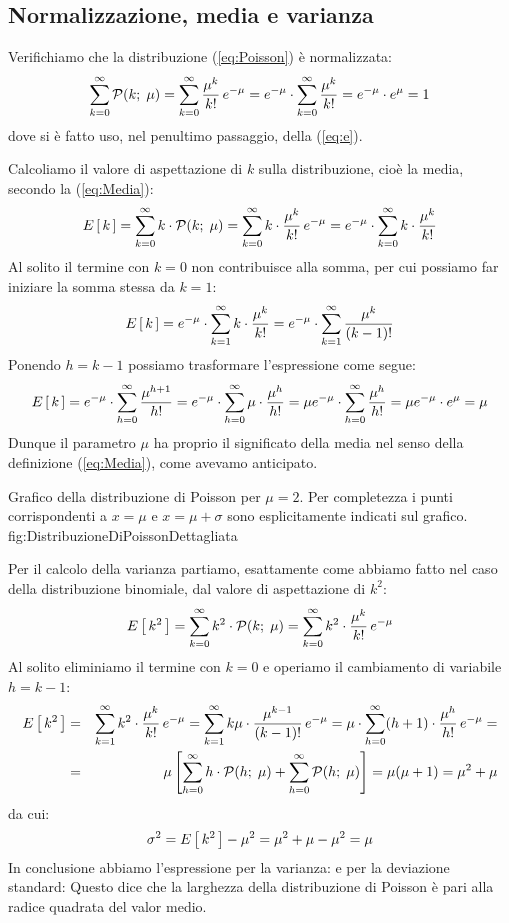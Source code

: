 \subsection{Normalizzazione, media e varianza}

Verifichiamo che la distribuzione (\ref{eq:Poisson}) \`e normalizzata:
$$
\dsum{\poissonpdf{k}{\mu}}{k}{0}{\infty} = 
\dsum{\frac{\mu^k}{k!} \, e^{-\mu}}{k}{0}{\infty} =
e^{-\mu} \cdot \dsum{\frac{\mu^k}{k!}}{k}{0}{\infty} = e^{-\mu} \cdot e^\mu = 1
$$
dove si \`e fatto uso, nel penultimo passaggio, della (\ref{eq:e}).

Calcoliamo il valore di aspettazione di $k$ sulla distribuzione,
cio\`e la media,
secondo la (\ref{eq:Media}):
$$
\expect{k} = \dsum{k \cdot \poissonpdf{k}{\mu}}{k}{0}{\infty}=
\dsum{k \cdot \frac{\mu^k}{k!} \, e^{-\mu}}{k}{0}{\infty} =
e^{-\mu} \cdot \dsum{k \cdot \frac{\mu^k}{k!}}{k}{0}{\infty}
$$
Al solito il termine con $k = 0$ non contribuisce alla somma, per cui
possiamo far iniziare la somma stessa da $k = 1$:
$$
\expect{k} = e^{-\mu} \cdot \dsum{k \cdot \frac{\mu^k}{k!}}{k}{1}{\infty} = 
e^{-\mu} \cdot \dsum{\frac{\mu^k}{(k - 1)!}}{k}{1}{\infty}
$$
Ponendo $h = k - 1$ possiamo trasformare l'espressione come segue:
$$
\expect{k} = e^{-\mu} \cdot \dsum{\frac{\mu^{h + 1}}{h!}}{h}{0}{\infty} =
e^{-\mu} \cdot \dsum{\mu \cdot \frac{\mu^{h}}{h!}}{h}{0}{\infty} =
\mu e^{-\mu} \cdot \dsum{\frac{\mu^{h}}{h!}}{h}{0}{\infty} =
\mu e^{-\mu} \cdot e^{\mu} = \mu
$$
Dunque il parametro $\mu$ ha proprio il significato della media nel senso
della definizione (\ref{eq:Media}), come avevamo anticipato.

\panelfig
{}
{Grafico della distribuzione di Poisson per $\mu = 2$.
Per completezza i punti corrispondenti a $x = \mu$ e $x = \mu + \sigma$
sono esplicitamente indicati sul grafico.}
{fig:DistribuzioneDiPoissonDettagliata}

Per il calcolo della varianza 
partiamo, esattamente come abbiamo fatto nel caso della distribuzione
binomiale, dal valore di aspettazione di $k^2$:
$$
\expect{k^2} = \dsum{k^2 \cdot \poissonpdf{k}{\mu}}{k}{0}{\infty}=
\dsum{k^2 \cdot \frac{\mu^k}{k!} \, e^{-\mu}}{k}{0}{\infty}
$$
Al solito eliminiamo il termine con $k = 0$ e operiamo il cambiamento
di variabile $h = k - 1$:
\begin{eqnarray*}
\expect{k^2} & = & \dsum{k^2 \cdot \frac{\mu^k}{k!}\, e^{-\mu}}{k}{1}{\infty} =
\dsum{k\mu \cdot \frac{\mu^{k - 1}}{(k - 1)!} \, e^{-\mu}}{k}{1}{\infty} =
\mu \cdot \dsum{(h + 1) \cdot \frac{\mu^{h}}{h!}\, e^{-\mu}}{h}{0}{\infty} =\\
& = & \mu \left[ \dsum{h \cdot \poissonpdf{h}{\mu}}{h}{0}{\infty} +
\dsum{\poissonpdf{h}{\mu}}{h}{0}{\infty}  \right] = \mu(\mu + 1) = \mu^2 + \mu
\end{eqnarray*}
da cui:
$$
\sigma^2 = \expect{k^2} - \mu^2 = \mu^2 + \mu - \mu^2 = \mu
$$
In conclusione abbiamo l'espressione per la varianza:
e per la deviazione standard:
Questo dice che la larghezza della distribuzione di Poisson \`e
pari alla radice quadrata del valor medio.

